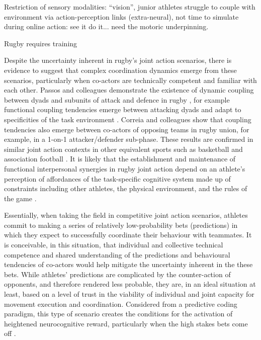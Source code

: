 \begin{CJK}{UTF8}{gbsn}
  Restriction of sensory modalities: ``vision'', junior athletes struggle to couple with environment via action-perception links (extra-neural), not time to simulate during online action: see it do it... need the motoric underpinning.



  Rugby requires training






  Despite the uncertainty inherent in rugby's joint action scenarios, there is evidence to suggest that complex coordination dynamics emerge from these scenarios, particularly when co-actors are technically competent and familiar with each other. Passos and colleagues demonstrate the existence of dynamic coupling between dyads and subunits of attack and defence in rugby \citep{Passos2011,Correia2014}, for example functional coupling tendencies emerge between attacking dyads and adapt to specificities of the task environment \textcite{Passos2011}.  Correia and colleagues \textcite{Correia2014} show that coupling tendencies also emerge between co-actors of opposing teams in rugby union, for example, in a 1-on-1 attacker/defender sub-phase.  These results are confirmed in similar joint action contexts in other equivalent sports such as basketball and association football \citep{Duarte2013}. It is likely that the establishment and maintenance of functional interpersonal synergies in rugby joint action depend on an athlete's perception of affordances of the task-specific cognitive system made up of constraints including other athletes, the physical environment, and the rules of the game \citep{Passos2012}.




  Essentially, when taking the field in competitive joint action scenarios, athletes commit to making a series of relatively low-probability bets (predictions) in which they expect to successfully coordinate their behaviour with teammates.  It is conceivable, in this situation, that individual and collective technical competence and shared understanding of the predictions and behavioural tendencies of co-actors would help mitigate the uncertainty inherent in the these bets.  While athletes' predictions are complicated by the counter-action of opponents, and therefore rendered less probable, they are, in an ideal situation at least, based on a level of trust in the viability of individual and joint capacity for movement execution and coordination.  Considered from a predictive coding paradigm, this type of scenario creates the conditions for the activation of heightened neurocognitive reward, particularly when the high stakes bets come off \citep{Chetverikov2016}.



\end{CJK}
